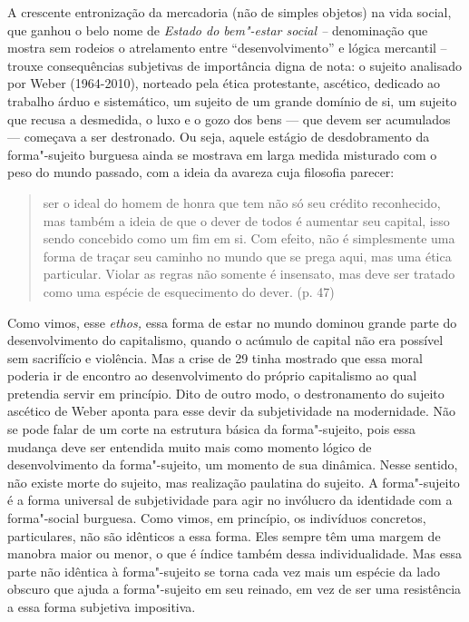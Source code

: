 A crescente entronização da mercadoria (não de simples objetos) na vida
social, que ganhou o belo nome de \emph{Estado do bem"-estar social --}
denominação que mostra sem rodeios o atrelamento entre
``desenvolvimento'' e lógica mercantil -- trouxe consequências
subjetivas de importância digna de nota: o sujeito analisado por Weber
(1964-2010), norteado pela ética protestante, ascético, dedicado ao
trabalho árduo e sistemático, um sujeito de um grande domínio de si, um
sujeito que recusa a desmedida, o luxo e o gozo dos bens --- que devem
ser acumulados --- começava a ser destronado. Ou seja, aquele estágio de
desdobramento da forma"-sujeito burguesa ainda se mostrava em larga
medida misturado com o peso do mundo passado, com a ideia da avareza
cuja filosofia parecer:

\begin{quote}
ser o ideal do homem de honra que tem não só seu crédito reconhecido,
mas também a ideia de que o dever de todos é aumentar seu capital, isso
sendo concebido como um fim em si. Com efeito, não é simplesmente uma
forma de traçar seu caminho no mundo que se prega aqui, mas uma ética
particular. Violar as regras não somente é insensato, mas deve ser
tratado como uma espécie de esquecimento do dever. (p. 47)
\end{quote}

Como vimos, esse \emph{ethos,} essa forma de estar no mundo dominou
grande parte do desenvolvimento do capitalismo, quando o acúmulo de
capital não era possível sem sacrifício e violência. Mas a crise de 29
tinha mostrado que essa moral poderia ir de encontro ao desenvolvimento
do próprio capitalismo ao qual pretendia servir em princípio. Dito de
outro modo, o destronamento do sujeito ascético de Weber aponta para
esse devir da subjetividade na modernidade. Não se pode falar de um
corte na estrutura básica da forma"-sujeito, pois essa mudança deve ser
entendida muito mais como momento lógico de desenvolvimento da
forma"-sujeito, um momento de sua dinâmica. Nesse sentido, não existe
morte do sujeito, mas realização paulatina do sujeito. A forma"-sujeito é
a forma universal de subjetividade para agir no invólucro da identidade
com a forma"-social burguesa. Como vimos, em princípio, os indivíduos
concretos, particulares, não são idênticos a essa forma. Eles sempre têm
uma margem de manobra maior ou menor, o que é índice também dessa
individualidade. Mas essa parte não idêntica à forma"-sujeito se torna
cada vez mais um espécie da lado obscuro que ajuda a forma"-sujeito em
seu reinado, em vez de ser uma resistência a essa forma subjetiva
impositiva.

